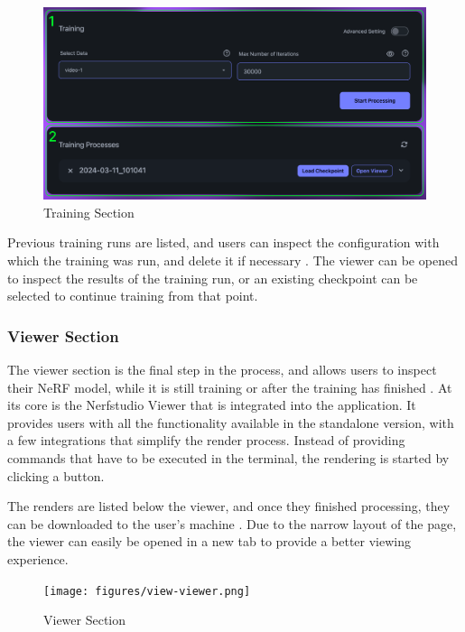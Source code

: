 \begin{figure}[h!]
  \centering
  \includegraphics[width=.7\textwidth]{figures/view-train.png}
  \caption{Training Section}
  \label{fig:design:training-section}
\end{figure}

Previous training runs are listed, and users can inspect the configuration with which the training was run, and delete it if necessary .
The viewer can be opened to inspect the results of the training run, or an existing checkpoint can be selected to continue training from that point.

\subsubsection*{Viewer Section}

The viewer section is the final step in the process, and allows users to inspect their NeRF model, while it is still training or after the training has finished .
At its core is the Nerfstudio Viewer that is integrated into the application.
It provides users with all the functionality available in the standalone version, with a few integrations that simplify the render process.
Instead of providing commands that have to be executed in the terminal, the rendering is started by clicking a button.

The renders are listed below the viewer, and once they finished processing, they can be downloaded to the user's machine .
Due to the narrow layout of the page, the viewer can easily be opened in a new tab to provide a better viewing experience.

\begin{figure}[h!]
  \centering
  \texttt{[image: figures/view-viewer.png]}
  \caption{Viewer Section}
  \label{fig:design:viewer-section}
\end{figure}

